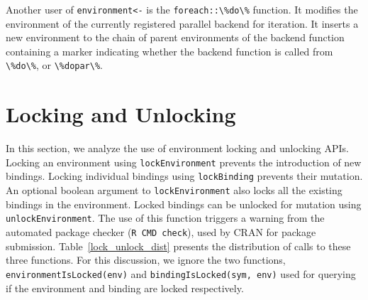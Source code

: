 \documentclass[10pt,review,sigplan,authorversion=true]{acmart}
\renewcommand{\c}[1]{\lstinline |#1|\xspace}
\begin{document}
Another user of \c{environment<-} is the \c{foreach::\%do\%} function. It
modifies the environment of the currently registered parallel backend for
iteration. It inserts a new environment to the chain of parent environments of
the backend function containing a marker indicating whether the backend function
is called from \c{\%do\%}, or \c{\%dopar\%}.

\section{Locking and Unlocking}

In this section, we analyze the use of environment locking and unlocking APIs.
Locking an environment using \c{lockEnvironment} prevents the introduction of
new bindings. Locking individual bindings using \c{lockBinding} prevents their
mutation. An optional boolean argument to \c{lockEnvironment} also locks all the
existing bindings in the environment. Locked bindings can be unlocked for
mutation using \c{unlockEnvironment}. The use of this function triggers a
warning from the automated package checker (\c{R CMD check}), used by CRAN for
package submission. Table~\ref{lock_unlock_dist} presents the distribution of
calls to these three functions. For this discussion, we ignore the two
functions, \c{environmentIsLocked(env)} and \c{bindingIsLocked(sym, env)} used
for querying if the environment and binding are locked respectively.
\end{document}
